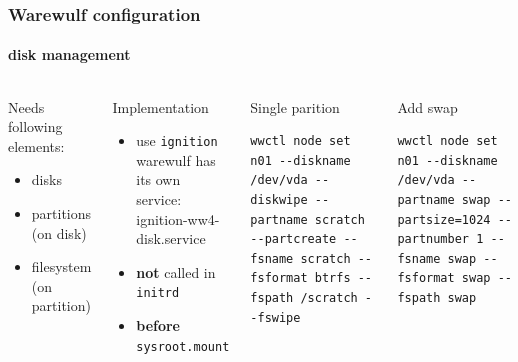 \documentclass[aspectratio=169]{beamer}
\begin{document}
\begin{frame}[fragile]
\frametitle{Warewulf configuration}
\framesubtitle{disk management}
\begin{columns}
\begin{block}{Needs following elements:}
\begin{itemize}
  \item disks
  \item partitions (on disk)
  \item filesystem (on partition)
\end{itemize}
\end{block}
\begin{block}{Implementation}
  \begin{itemize}
    \item use \texttt{ignition} \\ warewulf has its own service: {ignition-ww4-disk.service}
    \item \textbf{not}  called in \texttt{initrd}
    \item \textbf{before} \texttt{sysroot.mount}
  \end{itemize}
\end{block}
\begin{block}{Single parition}
\begin{lstlisting}[style=wwctl]
wwctl node set n01 --diskname /dev/vda --diskwipe --partname scratch --partcreate --fsname scratch --fsformat btrfs --fspath /scratch --fswipe
\end{lstlisting}
\end{block}
\begin{block}{Add swap}
\begin{lstlisting}[style=wwctl]
wwctl node set n01 --diskname /dev/vda --partname swap --partsize=1024 --partnumber 1 --fsname swap --fsformat swap --fspath swap
\end{lstlisting}
\end{block}
\end{columns}
\end{frame}
\end{document}
